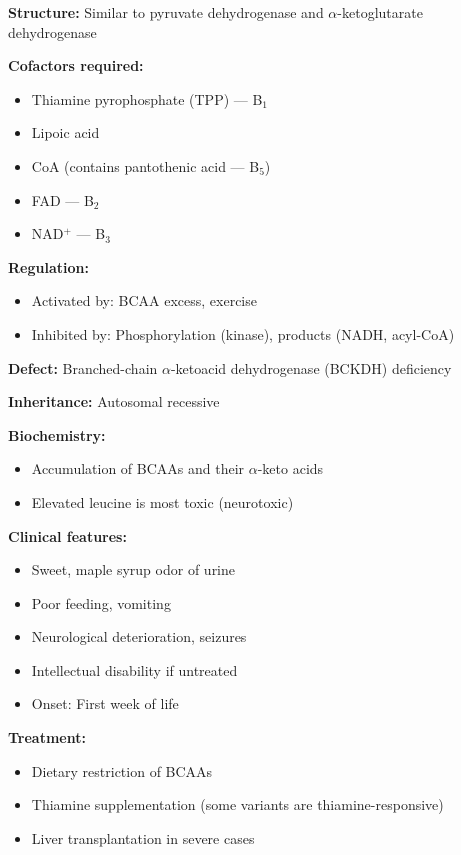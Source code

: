 \begin{tcolorbox}[colback=yellow!10, colframe=yellow!70!black, title=\textbf{Branched-Chain $\alpha$-Ketoacid Dehydrogenase (BCKDH)}]
\textbf{Structure:} Similar to pyruvate dehydrogenase and $\alpha$-ketoglutarate dehydrogenase

\textbf{Cofactors required:}
\begin{itemize}
    \item Thiamine pyrophosphate (TPP) — B$_1$
    \item Lipoic acid
    \item CoA (contains pantothenic acid — B$_5$)
    \item FAD — B$_2$
    \item NAD$^+$ — B$_3$
\end{itemize}

\textbf{Regulation:}
\begin{itemize}
    \item Activated by: BCAA excess, exercise
    \item Inhibited by: Phosphorylation (kinase), products (NADH, acyl-CoA)
\end{itemize}
\end{tcolorbox}

\begin{tcolorbox}[colback=red!5, colframe=red!70!black, title=\textbf{Clinical Correlation: Maple Syrup Urine Disease (MSUD)}]
\textbf{Defect:} Branched-chain $\alpha$-ketoacid dehydrogenase (BCKDH) deficiency

\textbf{Inheritance:} Autosomal recessive

\textbf{Biochemistry:}
\begin{itemize}
    \item Accumulation of BCAAs and their $\alpha$-keto acids
    \item Elevated leucine is most toxic (neurotoxic)
\end{itemize}

\textbf{Clinical features:}
\begin{itemize}
    \item Sweet, maple syrup odor of urine
    \item Poor feeding, vomiting
    \item Neurological deterioration, seizures
    \item Intellectual disability if untreated
    \item Onset: First week of life
\end{itemize}

\textbf{Treatment:}
\begin{itemize}
    \item Dietary restriction of BCAAs
    \item Thiamine supplementation (some variants are thiamine-responsive)
    \item Liver transplantation in severe cases
\end{itemize}
\end{tcolorbox}

